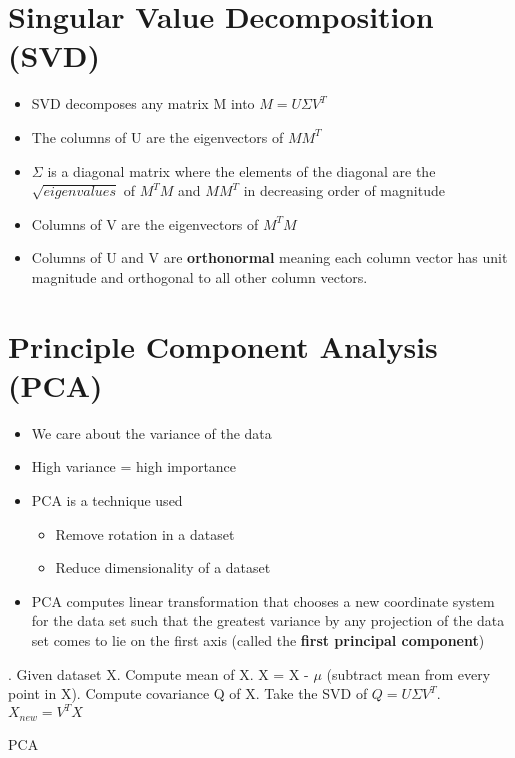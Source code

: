 \documentclass[../main.tex]{subfiles}
\begin{document}
    \section{Singular Value Decomposition (SVD)}
    \begin{itemize}
        \item SVD decomposes any matrix M into $M = U \Sigma V^{T}$
        \item The columns of U are the eigenvectors of $MM^{T}$
        \item $\Sigma$ is a diagonal matrix where the elements of the diagonal are the $\sqrt{eigenvalues}$ of $M^{T}M$ and $MM^{T}$ in decreasing order of magnitude
        \item Columns of V are the eigenvectors of $M^{T}M$
        \item Columns of U and V are \textbf{orthonormal} meaning each column vector has unit magnitude and orthogonal to all other column vectors.
    \end{itemize}

    \section{Principle Component Analysis (PCA)}
    \begin{itemize}
        \item We care about the variance of the data
        \item High variance = high importance
        \item PCA is a technique used
        \begin{itemize}
            \item Remove rotation in a dataset
            \item Reduce dimensionality of a dataset
        \end{itemize}
        \item PCA computes linear transformation that chooses a new coordinate system for the data set such that the greatest variance by any projection of the data set comes to lie on the first axis (called the \textbf{first principal component})
    \end{itemize}

    \begin{algorithm}[H]
        . Given dataset X. Compute mean of X. X = X - $\mu$ (subtract mean from every point in X). Compute covariance Q of X. Take the SVD of $Q = U\Sigma V^{T}$. $X_{new} = V^{T}X$\;
        \caption{PCA}
    \end{algorithm}
\end{document}
